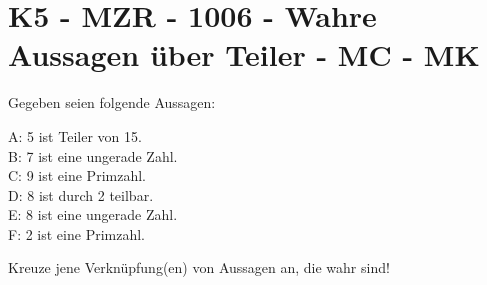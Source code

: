 \section{K5 - MZR - 1006 - Wahre Aussagen über Teiler - MC - MK}

\begin{beispiel}[K5 - MZR]{1}
Gegeben seien folgende Aussagen:
				
				A: 5 ist Teiler von 15.\\
				B: 7 ist eine ungerade Zahl.\\
				C: 9 ist eine Primzahl.\\
				D: 8 ist durch 2 teilbar.\\
				E: 8 ist eine ungerade Zahl.\\
				F: 2 ist eine Primzahl.
				
				Kreuze jene Verknüpfung(en) von Aussagen an, die wahr sind!
				
\end{beispiel}